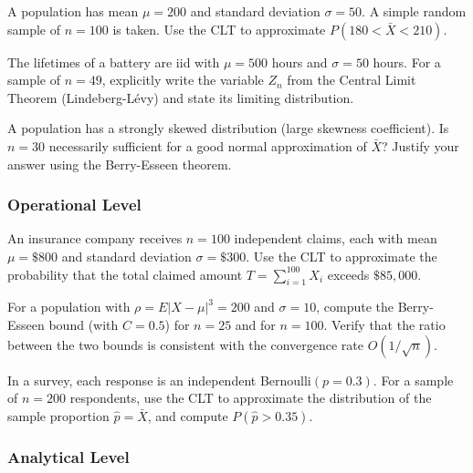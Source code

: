 \begin{problema}
	\label{prob:5.2.1}
	A population has mean $\mu=200$ and standard deviation $\sigma=50$. A simple random sample of $n=100$ is taken. Use the CLT to approximate $P(180 < \bar{X} < 210)$.
\end{problema}

\begin{problema}
	\label{prob:5.2.2}
	The lifetimes of a battery are iid with $\mu=500$ hours and $\sigma=50$ hours. For a sample of $n=49$, explicitly write the variable $Z_n$ from the Central Limit Theorem (Lindeberg-Lévy) and state its limiting distribution.
\end{problema}

\begin{problema}
	\label{prob:5.2.3}
	A population has a strongly skewed distribution (large skewness coefficient). Is $n=30$ necessarily sufficient for a good normal approximation of $\bar{X}$? Justify your answer using the Berry-Esseen theorem.
\end{problema}

\subsubsection*{Operational Level}

\begin{problema}
	\label{prob:5.2.4}
	An insurance company receives $n=100$ independent claims, each with mean $\mu=\$800$ and standard deviation $\sigma=\$300$. Use the CLT to approximate the probability that the total claimed amount $T=\sum_{i=1}^{100} X_i$ exceeds $\$85{,}000$.
\end{problema}

\begin{problema}
	\label{prob:5.2.5}
	For a population with $\rho = E|X-\mu|^3 = 200$ and $\sigma=10$, compute the Berry-Esseen bound (with $C=0.5$) for $n=25$ and for $n=100$. Verify that the ratio between the two bounds is consistent with the convergence rate $O(1/\sqrt{n})$.
\end{problema}

\begin{problema}
	\label{prob:5.2.6}
	In a survey, each response is an independent Bernoulli$(p=0.3)$. For a sample of $n=200$ respondents, use the CLT to approximate the distribution of the sample proportion $\hat{p}=\bar{X}$, and compute $P(\hat{p} > 0.35)$.
\end{problema}

\subsubsection*{Analytical Level}

